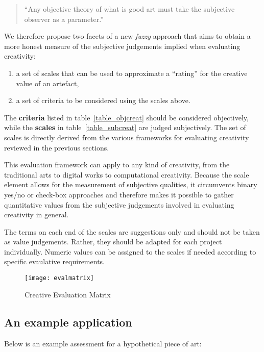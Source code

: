 \begin{quote}
  ``Any objective theory of what is good art must take the subjective observer as a parameter.'' \autocite{Schmidhuber2006}
\end{quote}

We therefore propose two facets of a new \textit{fuzzy} approach that aims to obtain a more honest measure of the subjective judgements implied when evaluating creativity:

\begin{enumerate}
  \item a set of scales that can be used to approximate a ``rating'' for the creative value of an artefact,
  \item a set of criteria to be considered using the scales above.
\end{enumerate}

The \textbf{criteria} listed in table~\ref{table_objcreat} should be considered objectively, while the \textbf{scales} in table~\ref{table_subcreat} are judged subjectively. The set of scales is directly derived from the various frameworks for evaluating creativity reviewed in the previous sections.

This evaluation framework can apply to any kind of creativity, from the traditional arts to digital works to computational creativity. Because the scale element allows for the measurement of subjective qualities, it circumvents binary yes/no or check-box approaches and therefore makes it possible to gather quantitative values from the subjective judgements involved in evaluating creativity in general.

The terms on each end of the scales are suggestions only and should not be taken as value judgements. Rather, they should be adapted for each project individually. Numeric values can be assigned to the scales if needed according to specific evaulative requirements.

\begin{figure}[htb]
  \centering
  \texttt{[image: evalmatrix]}
  \caption[Evaluation Matrix]{Creative Evaluation Matrix}
\label{evalmatrix}
\end{figure}


\subsection{An example application}

Below is an example assessment for a hypothetical piece of art:\\

